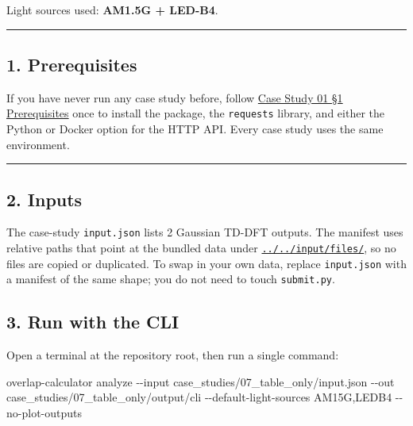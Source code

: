 \documentclass[
  11pt,
]{article}
\newenvironment{Shaded}{}{}
\newcommand{\AttributeTok}[1]{\textcolor[rgb]{0.49,0.56,0.16}{#1}}
\newcommand{\ExtensionTok}[1]{#1}
\newcommand{\NormalTok}[1]{#1}
\begin{document}
Light sources used: \textbf{AM1.5G + LED-B4}.

\begin{center}\rule{0.5\linewidth}{0.5pt}\end{center}

\hypertarget{1-prerequisites}{
\subsection{1. Prerequisites}\label{1-prerequisites}}

If you have never run any case study before, follow
\href{https://github.com/pinarsyt/overlap-calculator/blob/main/case_studies/01_theoretical_only/README.md\#1-prerequisites}{Case
Study 01 §1 Prerequisites} once to install the package, the
\texttt{requests} library, and either the Python or Docker option for
the HTTP API. Every case study uses the same environment.

\begin{center}\rule{0.5\linewidth}{0.5pt}\end{center}

\hypertarget{2-inputs}{
\subsection{2. Inputs}\label{2-inputs}}

The case-study \texttt{input.json} lists 2 Gaussian TD-DFT outputs. The
manifest uses relative paths that point at the bundled data under
\href{https://github.com/pinarsyt/overlap-calculator/blob/main/input/files}{\texttt{../../input/files/}},
so no files are copied or duplicated. To swap in your own data, replace
\texttt{input.json} with a manifest of the same shape; you do not need
to touch \texttt{submit.py}.

\hypertarget{3-run-with-the-cli}{
\subsection{3. Run with the CLI}\label{3-run-with-the-cli}}

Open a terminal at the repository root, then run a single command:

\begin{Shaded}
\begin{Highlighting}[]
\ExtensionTok{overlap{-}calculator}\NormalTok{ analyze }\AttributeTok{{-}{-}input}\NormalTok{ case\_studies/07\_table\_only/input.json }\AttributeTok{{-}{-}out}\NormalTok{ case\_studies/07\_table\_only/output/cli }\AttributeTok{{-}{-}default{-}light{-}sources}\NormalTok{ AM15G,LEDB4 }\AttributeTok{{-}{-}no{-}plot{-}outputs}
\end{Highlighting}
\end{Shaded}
\end{document}
